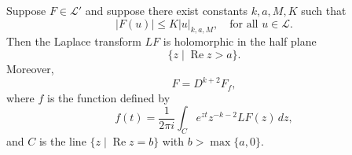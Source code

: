 Suppose $F \in \mathcal{L}'$ and suppose there exist constants $k, a, M, K$ such that
$$|F(u)| \leq K |u|_{k,a,M}, \quad \text{for all } u \in \mathcal{L}.$$
Then the Laplace transform $LF$ is holomorphic in the half plane
$$\{z \mid \operatorname{Re} z > a\}.$$
Moreover,
$$F = D^{k+2} F_f,$$
where $f$ is the function defined by
$$f(t) = \frac{1}{2\pi i} \int_C e^{zt} z^{-k-2} LF(z) \, dz,$$
and $C$ is the line $\{z \mid \operatorname{Re} z = b\}$ with $b > \max\{a, 0\}$.
